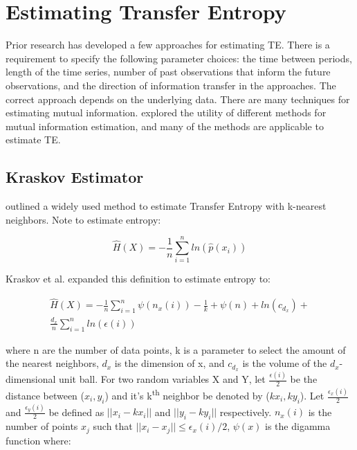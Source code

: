 \section{Estimating Transfer Entropy} \label{intro:estimateTE}

Prior research has developed a few approaches for estimating TE. There is a requirement to specify the following parameter choices: the time between periods, length of the time series, number of past observations that inform the future observations, and the direction of information transfer in the approaches. The correct approach depends on the underlying data. There are many techniques for estimating mutual information. \cite{EstimatingTE} explored the utility of different methods for mutual information estimation, and many of the methods are applicable to estimate TE.

\subsection{Kraskov Estimator} \label{intro:Kraskov}


\cite{kraskovEstimator} outlined a widely used method  to estimate Transfer Entropy with  k-nearest neighbors.  Note to estimate entropy:

\begin{equation}
\hat{H}(X) = - \frac{1}{n} \sum^n_{i=1} ln (\hat{p}(x_i)) 
\end{equation}

\noindent Kraskov et al. expanded this definition to estimate entropy to:

\setlength{\arraycolsep}{0.0em}
\begin{eqnarray}
\hat{H}(X) = - \frac{1}{n} \sum^n_{i=1} \psi(n_x(i)) - \frac{1}{k} + \psi(n) + ln (c_{d_x}) + \nonumber\\
 \frac{d_x}{n} \sum^n_{i=1} ln (\epsilon(i))
\end{eqnarray}
\setlength{\arraycolsep}{1pt}

\noindent where n are the number of data points, k is a parameter to select the amount of the nearest neighbors,  \(d_x\) is the dimension of x, and \(c_{d_x}\) is the volume of the \(d_x\)-dimensional unit ball. For two random variables X and Y, let \( \frac{\epsilon(i)}{2} \) be the distance between (\(x_i,y_i\)) and it's k\textsuperscript{th} neighbor be denoted by (\(kx_i,ky_i\)). Let \(\frac{\epsilon_x(i)}{2}\) and  \(\frac{\epsilon_y(i)}{2}\) be defined as \( ||x_i-kx_i ||\) and \( ||y_i-ky_i || \) respectively. \(n_x(i)\) is the number of points \(x_j\) such that \(||x_i - x_j  || \leq \epsilon_x(i)/2\), \(\psi(x)\) is the digamma function where:

